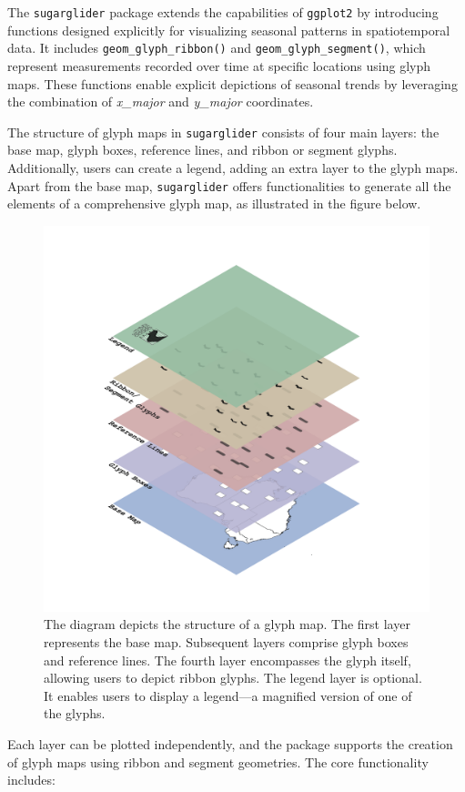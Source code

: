 The \texttt{sugarglider} package extends the capabilities of \texttt{ggplot2} by introducing functions designed explicitly for visualizing seasonal patterns in spatiotemporal data. It includes \texttt{geom\_glyph\_ribbon()} and \texttt{geom\_glyph\_segment()}, which represent measurements recorded over time at specific locations using glyph maps. These functions enable explicit depictions of seasonal trends by leveraging the combination of \emph{x\_major} and \emph{y\_major} coordinates.

The structure of glyph maps in \texttt{sugarglider} consists of four main layers: the base map, glyph boxes, reference lines, and ribbon or segment glyphs. Additionally, users can create a legend, adding an extra layer to the glyph maps. Apart from the base map, \texttt{sugarglider} offers functionalities to generate all the elements of a comprehensive glyph map, as illustrated in the figure below.

\begin{figure}

{\centering \includegraphics[width=0.6\linewidth]{figures/glyphmap-layers} 

}

\caption{The diagram depicts the structure of a glyph map. The first layer represents the base map. Subsequent layers comprise glyph boxes and reference lines. The fourth layer encompasses the glyph itself, allowing users to depict ribbon glyphs. The legend layer is optional. It enables users to display a legend—a magnified version of one of the glyphs.}\label{fig:unnamed-chunk-1}
\end{figure}

Each layer can be plotted independently, and the package supports the creation of glyph maps using ribbon and segment geometries. The core functionality includes:


